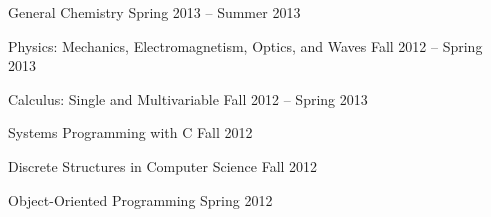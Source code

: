 \documentclass[letterpaper,MMMyyyy,nonstopmode]{simpleresumecv}
\begin{document}
\begin{Body}
\BigGap

\BulletItem
General Chemistry
\hfill Spring 2013 -- Summer 2013

\BulletItem
Physics: Mechanics, Electromagnetism, Optics, and Waves
\hfill Fall 2012 -- Spring 2013

\BulletItem
Calculus: Single and Multivariable
\hfill Fall 2012 -- Spring 2013

\BulletItem
Systems Programming with C
\hfill Fall 2012

\BulletItem
Discrete Structures in Computer Science
\hfill Fall 2012

\BulletItem
Object-Oriented Programming
\hfill Spring 2012

\end{Body}
\end{document}
